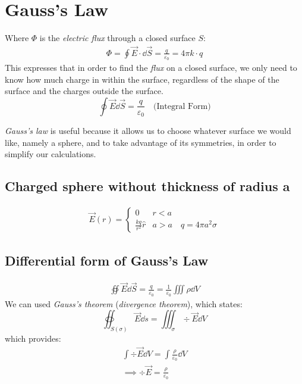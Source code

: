 \documentclass[00_complete]{subfiles}
\begin{document}
\section{Gauss's Law}
Where $\Phi$ is the \emph{electric flux} through a closed surface $S$:
\begin{gather*}
    \Phi = \oint \vec E \cdot \dd{\vec S} = \frac{q}{\varepsilon_0} = 4 \pi k
    \cdot q
\end{gather*}
This expresses that in order to find the \emph{flux} on a closed surface,
we only need to know how much charge in within the surface, regardless of the
shape of the surface and the charges outside the surface.
$$\boxed{\oint \vec E \dd{\vec S} = \frac{q}{\varepsilon_0}} \quad \text{(Integral
Form)}$$

\emph{Gauss's law} is useful because it allows us to choose whatever surface
we would like, namely a sphere, and to take advantage of its symmetries, in
order to simplify our calculations.

\subsection{Charged sphere without thickness of radius a}
\begin{gather*}
    \vec E(r) = \begin{cases}
        0 & r < a \\
        \frac{kq}{r^2}\hat r & a > a \quad q = 4 \pi a^2 \sigma
    \end{cases}
\end{gather*}

\subsection{Differential form of Gauss's Law}

\begin{gather*}\oiint \vec E \dd{\vec S} = \frac{q}{\varepsilon_0} =
    \frac{1}{\varepsilon_0}\iiint \rho \dd{V}
\end{gather*}
We can used \emph{Gauss's theorem} (\emph{divergence theorem}), which states:
$$\oiint_{S(\sigma)} \vec E \dd{s} =\iiint_\sigma \div \vec E \dd{V}$$
which provides:
\begin{gather*}
    \int \div \vec E \dd{V} = \int \frac{\rho}{\varepsilon_0} \dd{V} \\
    \implies \boxed{\div \vec E = \frac{\rho}{\varepsilon_0}}
\end{gather*}
\end{document}
